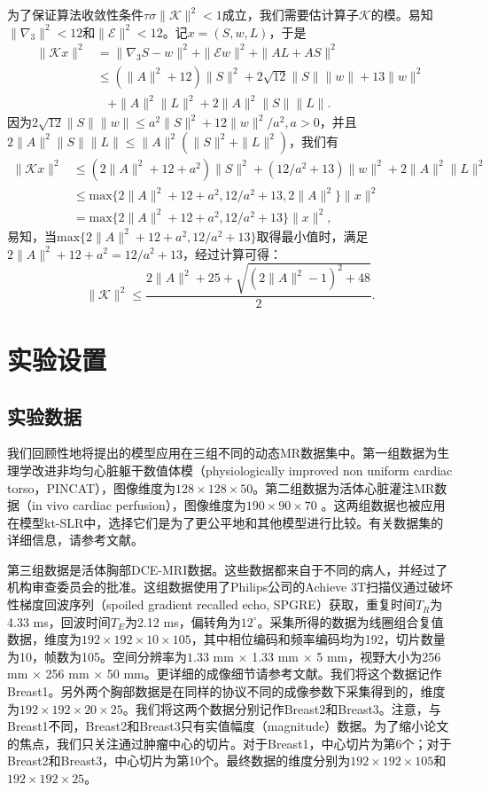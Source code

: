 为了保证算法收敛性条件$\tau\sigma\|\mathcal{K}\|^2<1$成立，我们需要估计算子$\mathcal{K}$的模。易知$\|\nabla_3\|^2<12$和$\|\mathcal{E}\|^2<12$。记$x=(S,w,L)$，于是
\begin{equation*}
	\begin{aligned}
		\|\mathcal{K}x\|^2&=\|\nabla_3 S-w\|^2+\|\mathcal{E} w\|^2+\|AL+AS\|^2 \\
		& \leq (\|A\|^2+12)\|S\|^2+2\sqrt{12}\|S\|\|w\|+13\|w\|^2\\
		& \ \ \ \ +\|A\|^2\|L\|^2+2\|A\|^2\|S\|\|L\|.
	\end{aligned}
\end{equation*}
因为$2\sqrt{12}\|S\|\|w\|\leq a^2\|S\|^2+12\|w\|^2/a^2, a>0$，并且$2\|A\|^2\|S\|\|L\|\leq \|A\|^2(\|S\|^2+\|L\|^2)$，我们有
\begin{equation*}
	\begin{aligned}
		\|\mathcal{K}x\|^2&\leq(2\|A\|^2+12+a^2)\|S\|^2+(12/a^2+13)\|w\|^2+2\|A\|^2\|L\|^2 \\
		&\leq \mathrm{max}\{2\|A\|^2+12+a^2,12/a^2+13,2\|A\|^2\}\|x\|^2 \\
		& = \mathrm{max}\{2\|A\|^2+12+a^2,12/a^2+13\}\|x\|^2,
	\end{aligned}
\end{equation*}
易知，当$\mathrm{max}\{2\|A\|^2+12+a^2,12/a^2+13\}$取得最小值时，满足$2\|A\|^2+12+a^2=12/a^2+13$，经过计算可得：
$$\|\mathcal{K}\|^2\leq \frac{2\|A\|^2+25+\sqrt{(2\|A\|^2-1)^2+48}}{2}.$$ 

\section{实验设置}
\subsection{实验数据}
我们回顾性地将提出的模型应用在三组不同的动态MR数据集中。第一组数据为生理学改进非均匀心脏躯干数值体模（physiologically improved non uniform cardiac torso，PINCAT），图像维度为$128\times 128\times 50$。第二组数据为活体心脏灌注MR数据（in vivo cardiac perfusion），图像维度为$190\times 90\times 70$ 。这两组数据也被应用在模型kt-SLR中，选择它们是为了更公平地和其他模型进行比较。有关数据集的详细信息，请参考文献\cite{segars2002study, sharif2007adaptive}。

第三组数据是活体胸部DCE-MRI数据。这些数据都来自于不同的病人，并经过了机构审查委员会的批准。这组数据使用了Philips公司的Achieve 3T扫描仪通过破坏性梯度回波序列（spoiled gradient recalled echo, SPGRE）获取，重复时间$T_R$为4.33 ms，回波时间$T_E$为2.12 ms，偏转角为$12^\circ$。采集所得的数据为线圈组合复值数据，维度为$192\times 192\times 10\times 105$，其中相位编码和频率编码均为192，切片数量为10，帧数为105。空间分辨率为$1.33$ mm $\times$ 1.33 mm $\times$ 5 mm，视野大小为256 mm $\times$ 256 mm $\times$ 50 mm。更详细的成像细节请参考文献\cite{li}。我们将这个数据记作Breast1。另外两个胸部数据是在同样的协议不同的成像参数下采集得到的，维度为$192\times 192\times 20\times 25$。我们将这两个数据分别记作Breast2和Breast3。注意，与Breast1不同，Breast2和Breast3只有实值幅度（magnitude）数据。为了缩小论文的焦点，我们只关注通过肿瘤中心的切片。对于Breast1，中心切片为第6个；对于Breast2和Breast3，中心切片为第10个。最终数据的维度分别为$192\times 192\times 105$和$192\times 192\times 25$。

